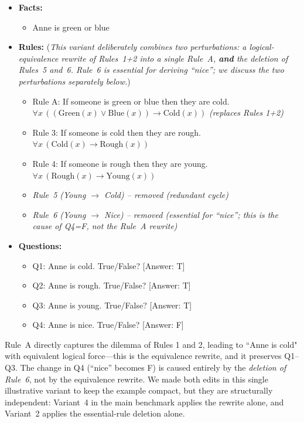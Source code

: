 \documentclass{article}
\begin{document}
\begin{itemize}
    \item \textbf{Facts:}
    \begin{itemize}
        \item Anne is green or blue
    \end{itemize}

    \item \textbf{Rules:} (\emph{This variant deliberately combines two perturbations: a logical-equivalence rewrite of Rules~1+2 into a single Rule~A, \textbf{and} the deletion of Rules~5 and~6. Rule~6 is essential for deriving ``nice''; we discuss the two perturbations separately below.})
    \begin{itemize}
        \item Rule A: If someone is green or blue then they are cold. $\forall x \, ((\text{Green}(x) \lor \text{Blue}(x)) \rightarrow \text{Cold}(x))$ \quad \emph{(replaces Rules 1+2)}
        \item Rule 3: If someone is cold then they are rough. $\forall x \, (\text{Cold}(x) \rightarrow \text{Rough}(x))$
        \item Rule 4: If someone is rough then they are young. $\forall x \, (\text{Rough}(x) \rightarrow \text{Young}(x))$
        \item \emph{Rule~5 (Young $\to$ Cold) -- removed (redundant cycle)}
        \item \emph{Rule~6 (Young $\to$ Nice) -- removed (essential for ``nice''; this is the cause of Q4=F, not the Rule~A rewrite)}
    \end{itemize}

    \item \textbf{Questions:}
    \begin{itemize}
        \item Q1: Anne is cold. True/False? [Answer: T]
        \item Q2: Anne is rough. True/False? [Answer: T]
        \item Q3: Anne is young. True/False? [Answer: T]
        \item Q4: Anne is nice. True/False? [Answer: F]
    \end{itemize}
\end{itemize}

Rule~A directly captures the dilemma of Rules 1 and 2, leading to ``Anne is cold" with equivalent logical force---this is the equivalence rewrite, and it preserves Q1--Q3. The change in Q4 (``nice'' becomes F) is caused entirely by the \emph{deletion of Rule~6}, not by the equivalence rewrite. We made both edits in this single illustrative variant to keep the example compact, but they are structurally independent: Variant~4 in the main benchmark applies the rewrite alone, and Variant~2 applies the essential-rule deletion alone.
\end{document}
